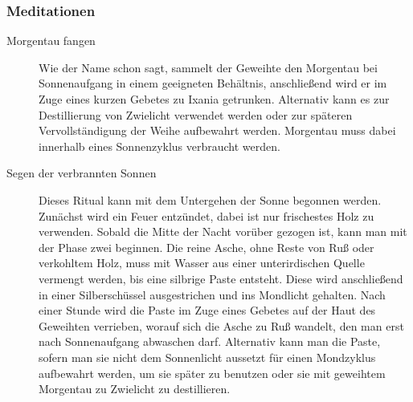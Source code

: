 \documentclass[a4paper,12pt,oneside]{book}
\begin{document}
 \subsubsection{Meditationen}
\begin{description}
\item[Morgentau fangen]
Wie der Name schon sagt, sammelt der Geweihte den Morgentau bei Sonnenaufgang in einem geeigneten Behältnis, anschließend wird er im Zuge eines kurzen Gebetes zu Ixania getrunken. Alternativ kann es zur Destillierung von Zwielicht verwendet werden oder zur späteren Vervollständigung der Weihe aufbewahrt werden. Morgentau muss dabei innerhalb eines Sonnenzyklus verbraucht werden.
\item[Segen der verbrannten Sonnen]
Dieses Ritual kann mit dem Untergehen der Sonne begonnen werden. Zunächst wird ein Feuer entzündet, dabei ist nur frischestes Holz zu verwenden. Sobald die Mitte der Nacht vorüber gezogen ist, kann man mit der Phase zwei beginnen. Die reine Asche, ohne Reste von Ruß oder verkohltem Holz, muss mit Wasser aus einer unterirdischen Quelle vermengt werden, bis eine silbrige Paste entsteht. Diese wird anschließend in einer Silberschüssel ausgestrichen und ins Mondlicht gehalten. Nach einer Stunde wird die Paste im Zuge eines Gebetes auf der Haut des Geweihten verrieben, worauf sich die Asche zu Ruß wandelt, den man erst nach Sonnenaufgang abwaschen darf. Alternativ kann man die Paste, sofern man sie nicht dem Sonnenlicht aussetzt für einen Mondzyklus aufbewahrt werden, um sie später zu benutzen oder sie mit geweihtem Morgentau zu Zwielicht zu destillieren.
\end{description}
\end{document}
